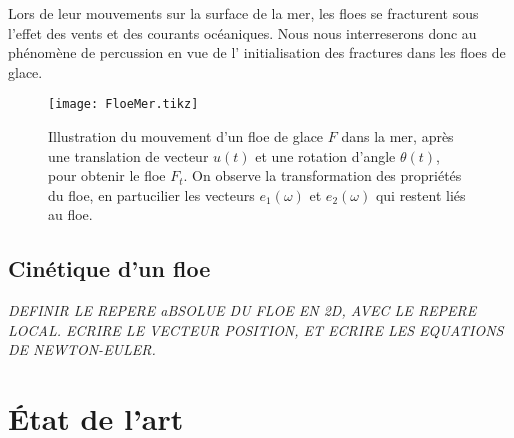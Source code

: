 Lors de leur mouvements sur la surface de la mer, les floes se fracturent sous l'effet des vents et des courants océaniques. Nous nous interreserons donc au phénomène de percussion en vue de l' initialisation des fractures dans les floes de glace. 


\begin{figure}
    \centering
    \texttt{[image: FloeMer.tikz]}
    \caption{Illustration du mouvement d'un floe de glace $F$ dans la mer, après une translation de vecteur $u(t)$ et une rotation d'angle $\theta(t)$, pour obtenir le floe $F_t$. On observe la transformation des propriétés du floe, en partucilier les vecteurs $e_1(\omega)$ et $e_2(\omega)$ qui restent liés au floe.}
\end{figure}


\subsection{Cinétique d'un floe}

\textit{DEFINIR LE REPERE aBSOLUE DU FLOE EN 2D, AVEC LE REPERE LOCAL. ECRIRE LE VECTEUR POSITION, ET ECRIRE LES EQUATIONS DE NEWTON-EULER.}





\section{État de l'art}
